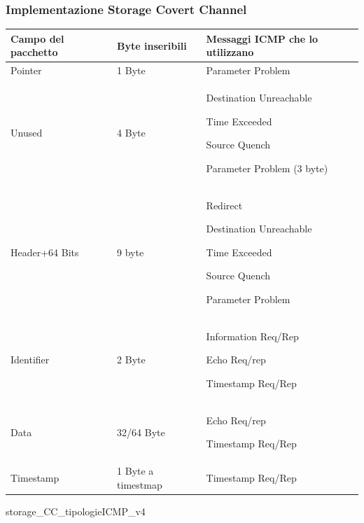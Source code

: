 \begin{frame} [fragile]
\frametitle{Implementazione Storage Covert Channel}
\scriptsize 
\begin{longtable}{|p{}|p{}|p{}|}
    \hline 
    \textbf{Campo del pacchetto} & \textbf{Byte inseribili} & \textbf{Messaggi ICMP che lo utilizzano} 
    \\ \hline 
    Pointer & 1 Byte & Parameter Problem \\ \hline 
    Unused & 4 Byte & 
        Destination Unreachable\par 
        Time Exceeded\par 
        Source Quench\par 
        Parameter Problem (3 byte) 
        \\ \hline 
    Header+64 Bits & 9 byte & 
        Redirect\par 
        Destination Unreachable\par 
        Time Exceeded\par 
        Source Quench\par 
        Parameter Problem 
        \\ \hline  
    Identifier & 2 Byte & 
        Information Req/Rep\par
        Echo Req/rep\par
        Timestamp Req/Rep
        \\ \hline 
    Data & 32/64 Byte& 
        Echo Req/rep\par
        Timestamp Req/Rep 
        \\ \hline 
    Timestamp & 1 Byte a timestmap & Timestamp Req/Rep \\ \hline  
\end{longtable} 
\end{frame} 
{storage_CC_tipologieICMP_v4} 
